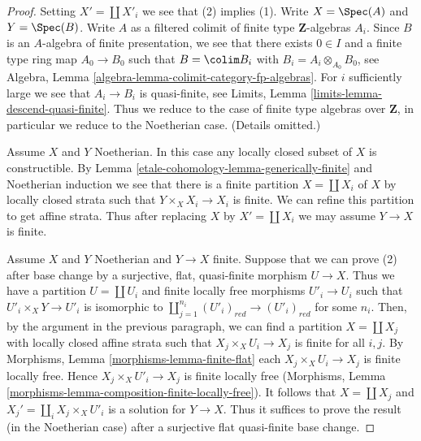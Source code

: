 \begin{proof}
Setting $X' = \coprod X'_i$ we see that (2) implies (1).
Write $X = \Spec(A)$ and $Y = \Spec(B)$. Write $A$ as a filtered colimit
of finite type $\mathbf{Z}$-algebras $A_i$. Since $B$ is an $A$-algebra of
finite presentation, we see that there exists $0 \in I$ and a
finite type ring map $A_0 \to B_0$ such that $B = \colim B_i$ with
$B_i = A_i \otimes_{A_0} B_0$, see
Algebra, Lemma \ref{algebra-lemma-colimit-category-fp-algebras}.
For $i$ sufficiently large we see that $A_i \to B_i$ is
quasi-finite, see Limits, Lemma \ref{limits-lemma-descend-quasi-finite}.
Thus we reduce to the case of finite type algebras over $\mathbf{Z}$,
in particular we reduce to the Noetherian case. (Details omitted.)

\medskip\noindent
Assume $X$ and $Y$ Noetherian. In this case any locally closed
subset of $X$ is constructible. By Lemma \ref{etale-cohomology-lemma-generically-finite}
and Noetherian induction we see that
there is a finite partition $X = \coprod X_i$ of $X$
by locally closed strata such that $Y \times_X X_i \to X_i$ is finite.
We can refine this partition to get affine strata.
Thus after replacing $X$ by $X' = \coprod X_i$ we may assume
$Y \to X$ is finite.

\medskip\noindent
Assume $X$ and $Y$ Noetherian and $Y \to X$ finite.
Suppose that we can prove (2) after base change by a surjective,
flat, quasi-finite morphism $U \to X$. Thus we have a partition
$U = \coprod U_i$ and finite locally free morphisms $U'_i \to U_i$
such that $U'_i \times_X Y \to U'_i$ is isomorphic to
$\coprod_{j = 1}^{n_i} (U'_i)_{red} \to (U'_i)_{red}$ for some $n_i$.
Then, by the argument in the previous paragraph, we can find a
partition $X = \coprod X_j$ with locally closed affine strata such that
$X_j \times_X U_i \to X_j$ is finite for all $i, j$. By
Morphisms, Lemma \ref{morphisms-lemma-finite-flat}
each $X_j \times_X U_i \to X_j$ is finite locally free.
Hence $X_j \times_X U'_i \to X_j$ is finite locally free
(Morphisms, Lemma \ref{morphisms-lemma-composition-finite-locally-free}).
It follows that $X = \coprod X_j$ and $X_j' = \coprod_i X_j \times_X U'_i$
is a solution for $Y \to X$. Thus it suffices to prove
the result (in the Noetherian case) after a surjective flat quasi-finite
base change.


\end{proof}
